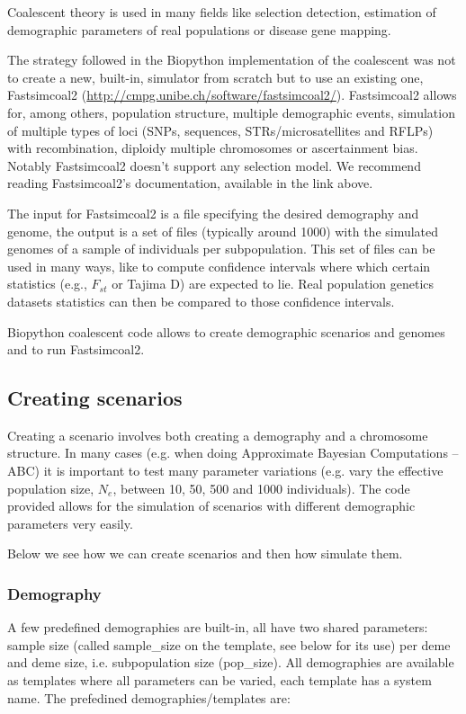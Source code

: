 \documentclass{report}
\begin{document}
Coalescent theory is used in many fields like selection detection, estimation of
demographic parameters of real populations or disease gene mapping.

The strategy followed in the Biopython implementation of the coalescent was not
to create a new, built-in, simulator from scratch but to use an existing one,
Fastsimcoal2 (\url{http://cmpg.unibe.ch/software/fastsimcoal2/}). Fastsimcoal2 allows for,
among others, population structure, multiple demographic events, simulation
of multiple types of loci (SNPs, sequences, STRs/microsatellites and RFLPs)
with recombination, diploidy multiple chromosomes or ascertainment bias. Notably
Fastsimcoal2 doesn't support any selection model. We recommend reading
Fastsimcoal2's
documentation, available in the link above.

The input for Fastsimcoal2 is a file specifying the desired demography and genome,
the output is a set of files (typically around 1000) with the simulated genomes
of a sample of individuals per subpopulation. This set of files can be used
in many ways, like to compute confidence intervals where which certain
statistics (e.g., $F_{st}$ or Tajima D) are expected to lie. Real population
genetics datasets statistics can then be compared to those confidence intervals.

Biopython coalescent code allows to create demographic scenarios and genomes and
to run Fastsimcoal2.

\subsection{Creating scenarios}

Creating a scenario involves both creating a demography and a chromosome structure.
In many cases (e.g. when doing Approximate Bayesian Computations -- ABC) it is
important to test many parameter variations (e.g. vary the effective population size,
$N_e$, between 10, 50, 500 and 1000 individuals). The code provided allows for
the simulation of scenarios with different demographic parameters very easily.

Below we see how we can create scenarios and then how simulate them.

\subsubsection{Demography}

A few predefined demographies are built-in, all have two shared parameters: sample size
(called sample\_size on the template, see below for its use) per deme and deme size, i.e.
subpopulation size (pop\_size). All demographies are available as templates where all
parameters can be varied, each template has a system name. The prefedined
demographies/templates are:
\end{document}
